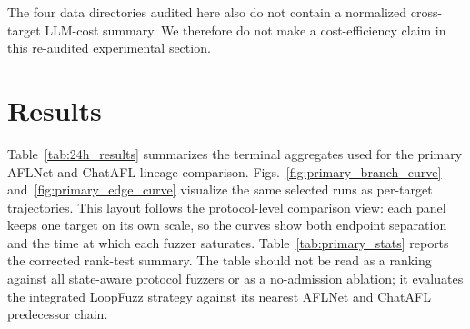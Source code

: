 \documentclass[final,5p,times,number]{elsarticle}
\begin{document}
\begin{table}[!t]
\centering
\caption{Archive status for the requested per-target admission-control behavior statistics. N/R means not recoverable from the current run-summary archive or submission packages. The missing fields require event-level admission logs or \texttt{fuzzer\_stats}/\texttt{stall-interactions} artifacts that are not present in the audited archive. These values are therefore excluded from empirical claims.}
\label{tab:admission_accounting_archive}
{\scriptsize
\setlength{\tabcolsep}{2.8pt}
\renewcommand{\arraystretch}{0.95}
}
\end{table}

The four data directories audited here also do not contain a normalized cross-target LLM-cost summary. We therefore do not make a cost-efficiency claim in this re-audited experimental section.

\section{Results}

Table~\ref{tab:24h_results} summarizes the terminal aggregates used for the primary AFLNet and ChatAFL lineage comparison. Figs.~\ref{fig:primary_branch_curve} and~\ref{fig:primary_edge_curve} visualize the same selected runs as per-target trajectories. This layout follows the protocol-level comparison view: each panel keeps one target on its own scale, so the curves show both endpoint separation and the time at which each fuzzer saturates. Table~\ref{tab:primary_stats} reports the corrected rank-test summary. The table should not be read as a ranking against all state-aware protocol fuzzers or as a no-admission ablation; it evaluates the integrated LoopFuzz strategy against its nearest AFLNet and ChatAFL predecessor chain.
\end{document}
